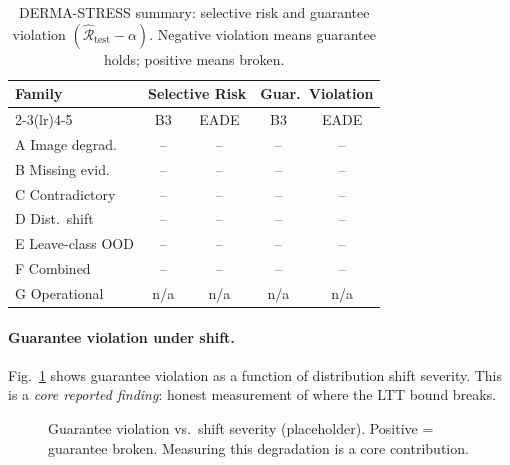 \documentclass[conference]{IEEEtran}
\newcommand{\1}{\mathbf{1}}
\newcommand{\calR}{\mathcal{R}}
\begin{document}
\begin{table}[H]
  \centering
  \caption{%
    DERMA-STRESS summary: selective risk and guarantee violation
    $(\hat{\calR}_{\text{test}} - \alpha)$. Negative violation means guarantee
    holds; positive means broken.
  }
  \label{tab:stress}
  \renewcommand{\arraystretch}{1.2}
  \small
  \begin{tabular}{lcccc}
    \toprule
    \multirow{2}{*}{\textbf{Family}}
      & \multicolumn{2}{c}{\textbf{Selective Risk}}
      & \multicolumn{2}{c}{\textbf{Guar.\ Violation}} \\
    \cmidrule(lr){2-3}\cmidrule(lr){4-5}
      & B3 & EADE & B3 & EADE \\
    \midrule
    A Image degrad.  & -- & -- & -- & -- \\
    B Missing evid.  & -- & -- & -- & -- \\
    C Contradictory  & -- & -- & -- & -- \\
    D Dist.\ shift   & -- & -- & -- & -- \\
    E Leave-class OOD& -- & -- & -- & -- \\
    F Combined       & -- & -- & -- & -- \\
    G Operational    & n/a & n/a & n/a & n/a \\
    \bottomrule
  \end{tabular}
\end{table}

\paragraph{Guarantee violation under shift.}
Fig.~\ref{fig:violation} shows guarantee violation as a function of
distribution shift severity. This is a \emph{core reported finding}:
honest measurement of where the LTT bound breaks.

\begin{figure}[H]
  \centering
  \caption{%
    Guarantee violation vs.\ shift severity (placeholder).
    Positive = guarantee broken. Measuring this degradation is a core contribution.
  }
  \label{fig:violation}
\end{figure}
\end{document}

